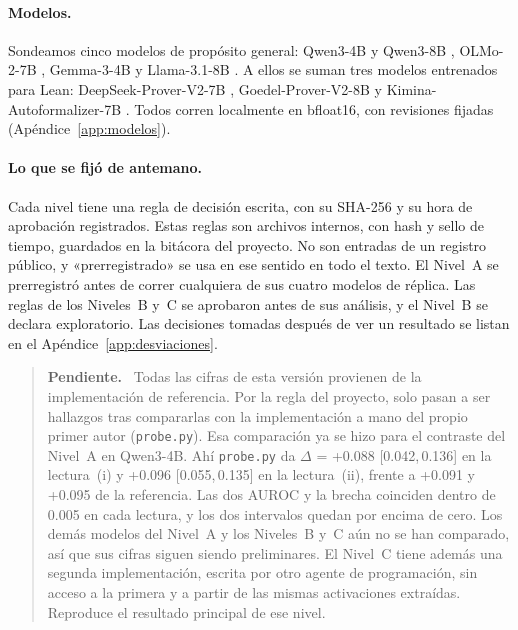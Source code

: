 \documentclass[10pt]{article}
\newcommand{\vr}[1]{\texttt{#1}}
\newcommand{\D}{\Delta}
\newcommand{\ic}[2]{[#1,\,#2]}
\newenvironment{pendiente}{\begin{quote}\small\noindent\textbf{Pendiente.}\ }{\end{quote}}
\begin{document}
\paragraph{Modelos.}
Sondeamos cinco modelos de propósito general: Qwen3-4B y Qwen3-8B \citep{qwen3}, OLMo-2-7B \citep{olmo2},
Gemma-3-4B \citep{gemma3} y Llama-3.1-8B \citep{llama3}. A ellos se suman tres modelos entrenados para Lean:
DeepSeek-Prover-V2-7B \citep{deepseekproverv2}, Goedel-Prover-V2-8B \citep{goedelproverv2} y
Kimina-Autoformalizer-7B \citep{kimina,kiminaautoformalizer}. Todos corren localmente en bfloat16, con
revisiones fijadas (Apéndice~\ref{app:modelos}).

\paragraph{Lo que se fijó de antemano.}
Cada nivel tiene una regla de decisión escrita, con su SHA-256 y su hora de aprobación registrados. Estas reglas son
archivos internos, con hash y sello de tiempo, guardados en la bitácora del proyecto. No son entradas de un registro
público, y «prerregistrado» se usa en ese sentido en todo el texto. El Nivel~A se prerregistró antes de correr
cualquiera de sus cuatro modelos de réplica. Las reglas de los Niveles~B y~C se aprobaron antes de sus análisis, y
el Nivel~B se declara exploratorio. Las decisiones tomadas después de ver un resultado se listan en el
Apéndice~\ref{app:desviaciones}.

\begin{pendiente}
Todas las cifras de esta versión provienen de la implementación de referencia. Por la regla del
proyecto, solo pasan a ser hallazgos tras compararlas con la implementación a mano del propio primer autor
(\vr{probe.py}). Esa comparación ya se hizo para el contraste del Nivel~A en Qwen3-4B. Ahí \vr{probe.py} da
$\D$ = +0.088 \ic{0.042}{0.136} en la lectura~(i) y +0.096 \ic{0.055}{0.135} en la lectura~(ii), frente a +0.091 y
+0.095 de la referencia. Las dos AUROC y la brecha coinciden dentro de 0.005 en cada lectura, y los dos intervalos
quedan por encima de cero. Los demás modelos del Nivel~A y los Niveles~B y~C aún no se han comparado, así que sus
cifras siguen siendo preliminares. El Nivel~C tiene además una segunda implementación, escrita por otro agente
de programación, sin acceso a la primera y a partir de las mismas activaciones extraídas. Reproduce el resultado
principal de ese nivel.
\end{pendiente}

\end{document}
